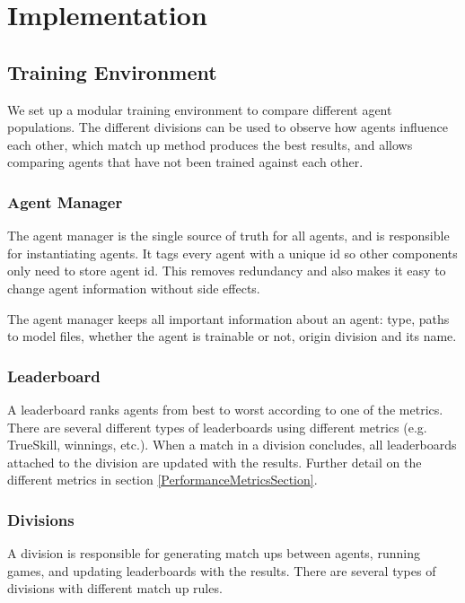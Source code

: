 \chapter{Implementation}

\section{Training Environment}
We set up a modular training environment to compare different agent populations. The different divisions can be used to observe how agents influence each other, which match up method produces the best results, and allows comparing agents that have not been trained against each other. 

\subsection{Agent Manager}
The agent manager is the single source of truth for all agents, and is responsible for instantiating agents. It tags every agent with a unique id so other components only need to store agent id. This removes redundancy and also makes it easy to change agent information without side effects.

The agent manager keeps all important information about an agent: type, paths to model files, whether the agent is trainable or not, origin division and its name.

\subsection{Leaderboard}
A leaderboard ranks agents from best to worst according to one of the metrics. There are several different types of leaderboards using different metrics (e.g. TrueSkill, winnings, etc.). When a match in a division concludes, all leaderboards attached to the division are updated with the results. Further detail on the different metrics in section \ref{PerformanceMetricsSection}.


\subsection{Divisions}
A division is responsible for generating match ups between agents, running games, and updating leaderboards with the results. There are several types of divisions with different match up rules.

